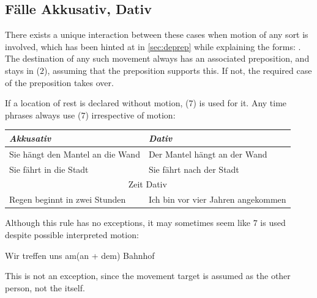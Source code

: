 \subsection[Cases Akkusativ, Dativ]{Fälle Akkusativ, Dativ}
There exists a unique interaction between these cases when motion of any sort is involved, which has been hinted at in \autoref{sec:deprep} while explaining the forms: . The destination of any such movement  always has an associated preposition, and stays in ($2$), assuming that the  preposition supports this. If not, the required case of the preposition takes over.

If a location of rest is declared without motion, ($7$) is used for it. Any time phrases always use ($7$) irrespective of motion:
\begin{example}
    \begin{tabular}{m{7cm}|m{7cm}}
        \textit{Akkusativ} & \textit{Dativ}\\\hline
        Sie hängt den Mantel an die Wand & Der Mantel hängt an der Wand\\\hline
        Sie fährt in die Stadt & Sie fährt nach der Stadt\\\hline
        \multicolumn{2}{c}{Zeit Dativ}\\\hline
        Regen beginnt in zwei Stunden & Ich bin vor vier Jahren angekommen
    \end{tabular}
\end{example}
Although this rule has no exceptions,  it may sometimes seem like $7$  is used despite possible interpreted motion:
\begin{example}
    Wir treffen uns am(an + dem) Bahnhof
\end{example}
This is not an exception, since the movement target is assumed as the other person, not the  itself.
